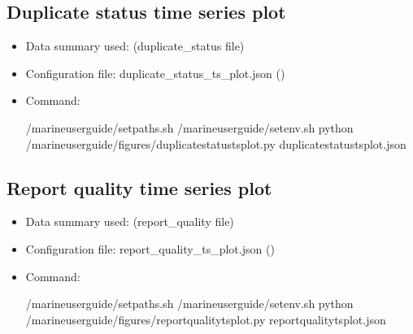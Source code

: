 \documentclass[letterpaper,10pt,english]{sphinxmanual}
\begin{document}
\subsection{Duplicate status time series plot}
\label{\detokenize{index:duplicate-status-time-series-plot}}\begin{itemize}
\item {} 
Data summary used: {\hyperref[\detokenize{index:qi-counts-um-section}]{}} (duplicate\_status file)

\item {} 
Configuration file: duplicate\_status\_ts\_plot.json ({\hyperref[\detokenize{index:nreports-dup-ts-config}]{}})

\item {} 
Command:

\begin{sphinxVerbatim}[commandchars=\\\{\}]
 /marine\PYGZhy{}user\PYGZhy{}guide/setpaths.sh
 /marine\PYGZhy{}user\PYGZhy{}guide/setenv.sh
python /marine\PYGZhy{}user\PYGZhy{}guide/figures/duplicate\PYGZus{}status\PYGZus{}ts\PYGZus{}plot.py duplicate\PYGZus{}status\PYGZus{}ts\PYGZus{}plot.json
\end{sphinxVerbatim}

\end{itemize}


\subsection{Report quality time series plot}
\label{\detokenize{index:report-quality-time-series-plot}}\begin{itemize}
\item {} 
Data summary used: {\hyperref[\detokenize{index:qi-counts-um-section}]{}} (report\_quality file)

\item {} 
Configuration file: report\_quality\_ts\_plot.json ({\hyperref[\detokenize{index:nreports-qc-ts-config}]{}})

\item {} 
Command:

\begin{sphinxVerbatim}[commandchars=\\\{\}]
 /marine\PYGZhy{}user\PYGZhy{}guide/setpaths.sh
 /marine\PYGZhy{}user\PYGZhy{}guide/setenv.sh
python /marine\PYGZhy{}user\PYGZhy{}guide/figures/report\PYGZus{}quality\PYGZus{}ts\PYGZus{}plot.py report\PYGZus{}quality\PYGZus{}ts\PYGZus{}plot.json
\end{sphinxVerbatim}

\end{itemize}
\end{document}
